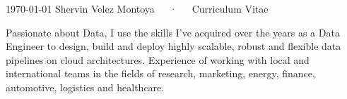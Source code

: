 \documentclass[11pt, a4paper]{awesome-cv}
\begin{document}
\makecvheader
\makecvfooter
{\today}
{Shervin Velez Montoya~~~·~~~Curriculum Vitae}
{}


\begin{cvparagraph}
    Passionate about Data, I use the skills I've acquired over the years as a Data Engineer to design, build and deploy highly scalable, robust and flexible data pipelines on cloud architectures.
    Experience of working with local and international teams in the fields of research, marketing, energy, finance, automotive, logistics and healthcare.
\end{cvparagraph}





\end{document}
